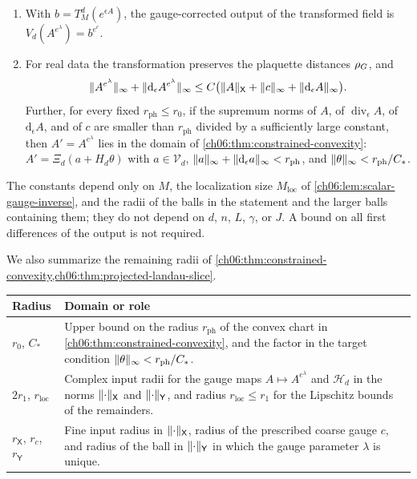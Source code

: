 \begin{theorem}
\begin{enumerate}
\item With $b=T_M^d(e^{\epsilon A})$, the gauge-corrected output of the transformed field is $V_d(A^{e^\lambda})=b^{e^c}$.
\item For real data the transformation preserves the plaquette distances $\rho_G$, and
\[
 \lVert A^{e^\lambda}\rVert_\infty+\lVert \mathrm d_\epsilon A^{e^\lambda}\rVert_\infty\le C\bigl(\lVert A\rVert_{\mathsf X}+\lVert c\rVert_\infty+\lVert \mathrm d_\epsilon A\rVert_\infty\bigr).
\]
Further, for every fixed $r_{\mathrm{ph}}\le r_0$, if the supremum norms of $A$, of $\operatorname{div}_\epsilon A$, of $\mathrm d_\epsilon A$, and of $c$ are smaller than $r_{\mathrm{ph}}$ divided by a sufficiently large constant, then $A'=A^{e^\lambda}$ lies in the domain of \cref{ch06:thm:constrained-convexity}: $A'=\Xi_d(a+H_d\theta)$ with $a\in\mathcal V_d$, $\lVert a\rVert_\infty+\lVert \mathrm d_\epsilon a\rVert_\infty<r_{\mathrm{ph}}$, and $\lVert \theta\rVert_\infty<r_{\mathrm{ph}}/C_*$.
\end{enumerate}
The constants depend only on $M$, the localization size $M_{\mathrm{loc}}$ of \cref{ch06:lem:scalar-gauge-inverse}, and the radii of the balls in the statement and the larger balls containing them; they do not depend on $d$, $n$, $L$, $\gamma$, or $J$. A bound on all first differences of the output is not required.
\end{theorem}

We also summarize the remaining radii of \cref{ch06:thm:constrained-convexity,ch06:thm:projected-landau-slice}.
\begin{center}
\small
\begin{tabular}{>{\raggedright\arraybackslash}p{2.6cm}>{\raggedright\arraybackslash}p{11.4cm}}
\toprule
Radius & Domain or role\\
\midrule
$r_0$, $C_*$ & Upper bound on the radius $r_{\mathrm{ph}}$ of the convex chart in \cref{ch06:thm:constrained-convexity}, and the factor in the target condition $\lVert \theta\rVert_\infty<r_{\mathrm{ph}}/C_*$.\\
$2r_1$, $r_{\mathrm{loc}}$ & Complex input radii for the gauge maps $A\mapsto A^{e^\lambda}$ and $\mathscr H_d$ in the norms $\lVert \cdot\rVert_{\mathsf X}$ and $\lVert \cdot\rVert_{\mathsf Y}$, and radius $r_{\mathrm{loc}}\le r_1$ for the Lipschitz bounds of the remainders.\\
$r_{\mathsf X}$, $r_c$, $r_{\mathsf Y}$ & Fine input radius in $\lVert \cdot\rVert_{\mathsf X}$, radius of the prescribed coarse gauge $c$, and radius of the ball in $\lVert \cdot\rVert_{\mathsf Y}$ in which the gauge parameter $\lambda$ is unique.\\
\bottomrule
\end{tabular}
\end{center}

